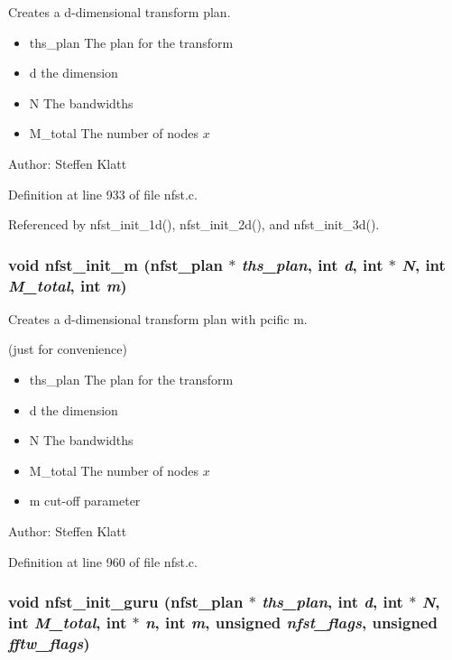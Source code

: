 Creates a d-dimensional transform plan. 

\begin{itemize}
\item ths\_\-plan The plan for the transform \item d the dimension \item N The bandwidths \item M\_\-total The number of nodes $x$\end{itemize}
\begin{Desc}
\item[Author:]Steffen Klatt \end{Desc}


Definition at line 933 of file nfst.c.

Referenced by nfst\_\-init\_\-1d(), nfst\_\-init\_\-2d(), and nfst\_\-init\_\-3d().\hypertarget{group__nfsct_g8a48a14e97780c89216d09bdb75f513a}{
\subsubsection{\setlength{\rightskip}{0pt plus 5cm}void nfst\_\-init\_\-m ({\bf nfst\_\-plan} $\ast$ {\em ths\_\-plan}, int {\em d}, int $\ast$ {\em N}, int {\em M\_\-total}, int {\em m})}}
\label{group__nfsct_g8a48a14e97780c89216d09bdb75f513a}


Creates a d-dimensional transform plan with pcific m. 

(just for convenience)

\begin{itemize}
\item ths\_\-plan The plan for the transform \item d the dimension \item N The bandwidths \item M\_\-total The number of nodes $x$ \item m cut-off parameter\end{itemize}
\begin{Desc}
\item[Author:]Steffen Klatt \end{Desc}


Definition at line 960 of file nfst.c.\hypertarget{group__nfsct_g052efac9f85424d50ceb77279c4e8cc3}{
\subsubsection{\setlength{\rightskip}{0pt plus 5cm}void nfst\_\-init\_\-guru ({\bf nfst\_\-plan} $\ast$ {\em ths\_\-plan}, int {\em d}, int $\ast$ {\em N}, int {\em M\_\-total}, int $\ast$ {\em n}, int {\em m}, unsigned {\em nfst\_\-flags}, unsigned {\em fftw\_\-flags})}}
\label{group__nfsct_g052efac9f85424d50ceb77279c4e8cc3}


